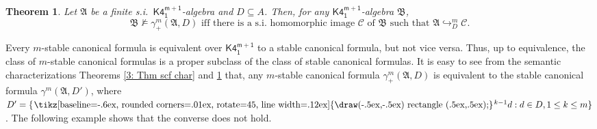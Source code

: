 \documentclass[a4paper,11pt]{article}
\newtheorem{theorem}{Theorem}
\theoremstyle{definition}
\theoremstyle{remark}
\numberwithin{theorem}{section}
\newcommand{\alg}[1]{\mathfrak{#1}}
\newcommand{\A}{\alg{A}}
\newcommand{\B}{\alg{B}}
\newcommand{\class}[1]{\mathcal{#1}}
\newcommand{\C}{\class{C}}
\newcommand{\logic}[1]{\mathsf{#1}}
\newcommand{\Kff}[2]{\logic{K4^{#1}_{#2}}}
\newcommand{\gooddiamond}{\hspace{.2ex}\text{%
  \tikz[baseline=-.6ex, rounded corners=.01ex, rotate=45, line width=.12ex]
    {\draw(-.5ex,-.5ex) rectangle (.5ex,.5ex);}}\kern.2ex}
\renewcommand{\Diamond}{\gooddiamond}
\newcommand{\Dia}{\Diamond}
\newcommand{\inj}{\hookrightarrow}
\begin{document}
\begin{theorem} \label{3: Thm mscf char}
    Let $\A$ be a finite s.i.~$\Kff{m+1}{1}$-algebra and $D \subseteq A$. Then, for any  $\Kff{m+1}{1}$-algebra $\B$, 
    \[\B \not\models \gamma_+^m(\A, D) \text{ iff there is a s.i.~homomorphic image $\C$ of $\B$ such that $\A \inj^m_D \C$}.\]
\end{theorem}

Every $m$-stable canonical formula is equivalent over $\Kff{m+1}{1}$ to a stable canonical formula, but not vice versa. Thus, up to equivalence, the class of $m$-stable canonical formulas is a proper subclass of the class of stable canonical formulas. It is easy to see from the semantic characterizations Theorems \ref{3: Thm scf char} and \ref{3: Thm mscf char} that, any $m$-stable canonical formula $\gamma_+^m(\A, D)$ is equivalent to the stable canonical formula $\gamma^m(\A, D')$, where $D' = \{\Dia^{k-1} d: d \in D, 1 \leq k \leq m\}$. The following example shows that the converse does not hold.
\end{document}
